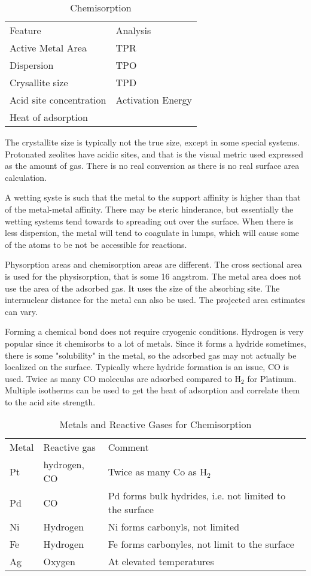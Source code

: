 \documentclass[12pt,a4paper,oneside,headinclude]{scrartcl}
\numberwithin{figure}{section}
\numberwithin{equation}{section}
\numberwithin{table}{section}
\begin{document}
\begin{table}[htbp]
\caption{Chemisorption}
\centering
\begin{tabular}{ll}
Feature & Analysis\\
Active Metal Area & TPR\\
Dispersion & TPO\\
Crysallite size & TPD\\
Acid site concentration & Activation Energy\\
Heat of adsorption & \\
\hline
\end{tabular}
\end{table}

The crystallite size is typically not the true size, except in some special
systems. Protonated zeolites have acidic sites, and that is the visual metric
used expressed as the amount of gas. There is no real conversion as there is no
real surface area calculation.

A wetting syste is such that the metal to the support affinity is higher than
that of the metal-metal affinity. There may be steric hinderance, but
essentially the wetting systems tend towards to spreading out over the surface.
When there is less dispersion, the metal will tend to coagulate in lumps, which
will cause some of the atoms to be not be accessible for reactions.

Physorption areas and chemisorption areas are different. The cross sectional
area is used for the physisorption, that is some 16 angstrom. The metal area
does not use the area of the adsorbed gas. It uses the size of the absorbing
site. The internuclear distance for the metal can also be used. The projected
area estimates can vary.

Forming a chemical bond does not require cryogenic conditions. Hydrogen is very
popular since it chemisorbs to a lot of metals. Since it forms a hydride
sometimes, there is some "solubility" in the metal, so the adsorbed gas may not
actually be localized on the surface. Typically where hydride formation is an
issue, CO is used. Twice as many CO moleculas are adsorbed compared to H\(_{\text{2}}\) for
Platinum. Multiple isotherms can be used to get the heat of adsorption and
correlate them to the acid site strength.

\begin{table}[htbp]
\caption{Metals and Reactive Gases for Chemisorption}
\centering
\begin{tabular}{lll}
Metal & Reactive gas & Comment\\
Pt & hydrogen, CO & Twice as many Co as H\(_{\text{2}}\)\\
Pd & CO & Pd forms bulk hydrides, i.e. not limited to the surface\\
Ni & Hydrogen & Ni forms carbonyls, not limited\\
Fe & Hydrogen & Fe forms carbonyles, not limit to the surface\\
Ag & Oxygen & At elevated temperatures\\
\hline
\end{tabular}
\end{table}
\end{document}

